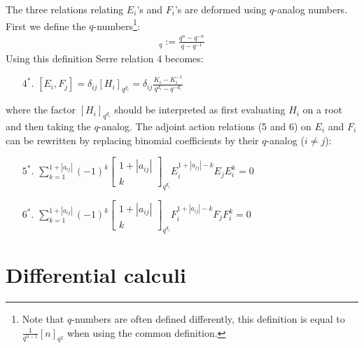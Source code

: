 \begin{construct}
		The three relations relating $E_i$'s and $F_i$'s are deformed using $q$-analog numbers. First we define the $q$-numbers\footnote{Note that $q$-numbers are often defined differently, this definition is equal to $\frac{1}{q^{n-1}}[n]_{q^2}$ when using the common definition.}:
		\begin{gather}
			[n]_q := \frac{q^n - q^{-n}}{q - q^{-1}}
		\end{gather}
		Using this definition Serre relation 4 becomes:
		\begin{enumerate}
			\item[$4^*.$] $[E_i, F_j] = \delta_{ij}[H_i]_{q^{d_i}} = \delta_{ij}\frac{K_i - K_i^{-1}}{q^{d_i} - q^{-d_i}}$
		\end{enumerate}
		where the factor $[H_i]_{q^{d_i}}$ should be interpreted as first evaluating $H_i$ on a root and then taking the $q$-analog. The adjoint action relations (5 and 6) on $E_i$ and $F_i$ can be rewritten by replacing binomial coefficients by their $q$-analog ($i\neq j$):
		\begin{enumerate}
			\item[$5^*.$] $\sum_{k=1}^{1+|a_{ij}|} (-1)^k\begin{bmatrix}1+|a_{ij}|\\k\end{bmatrix}_{q^{d_i}}E_i^{1+|a_{ij}|-k}E_jE_i^k = 0$
			\item[$6^*.$] $\sum_{k=1}^{1+|a_{ij}|} (-1)^k\begin{bmatrix}1+|a_{ij}|\\k\end{bmatrix}_{q^{d_i}}F_i^{1+|a_{ij}|-k}F_jF_i^k = 0$
		\end{enumerate}
	\end{construct}

\section{Differential calculi}

